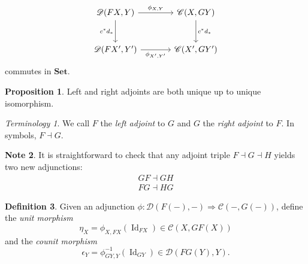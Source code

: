 \documentclass[10pt,letterpaper,cm]{nupset}
\theoremstyle{definition}
\newtheorem{definition}{Definition}[section]
\newtheorem{note}[definition]{Note}
\theoremstyle{theorem}
\newtheorem{prop}[definition]{Proposition}
\theoremstyle{remark}
\newtheorem*{term}{Terminology}
\newcommand{\1}{\mathbf{1}}
\renewcommand{\c}{\mathscr{C}}
\renewcommand{\d}{\mathscr{D}}
\newcommand{\0}{\vec 0}
\DeclareMathOperator{\id}{Id}
\begin{document}
\[
\begin{tikzcd}[row sep=large, column sep = large]
\d(F{X}, Y) \arrow[r, "\phi_{X, Y}"] \arrow[d, "c^{\ast}d_{\ast}", swap]
& \c(X, G{Y}) \arrow[d, "c^{\ast}d_{\ast}"] \\
\d(F{X'}, Y')\arrow[r, "\phi_{X', Y'}"']
& \c(X', G{Y'})  
\end{tikzcd}
\] commutes in $\mathbf{Set}$.

\begin{prop}
Left and right adjoints are both unique up to unique isomorphism.
\end{prop}

\begin{term}
We call $F$ the \textit{left adjoint} to $G$ and $G$ the \textit{right adjoint} to $F$. In symbols, $F \dashv G$.
\end{term}

\begin{note}
It is straightforward to check that any adjoint triple $F \dashv G \dashv H$ yields two new adjunctions:
\begin{gather*}
G{F} \dashv G{H}
\\ F{G} \dashv H{G}
\end{gather*}
\end{note}



\begin{definition}
Given an adjunction $\phi: \d(F(-), -) \Rightarrow \c(-, G(-))$, define the \textit{unit morphism } $$\eta_X =\phi_{X, F{X}}\left(\id_{F{X}}\right) \in \c(X, GF(X))$$ and the \textit{counit morphism} $$\epsilon_Y =\phi_{G{Y}, Y}^{{-1}}\left(\id_{G{Y}}\right) \in \d(FG(Y), Y).$$
\end{definition}
\end{document}

